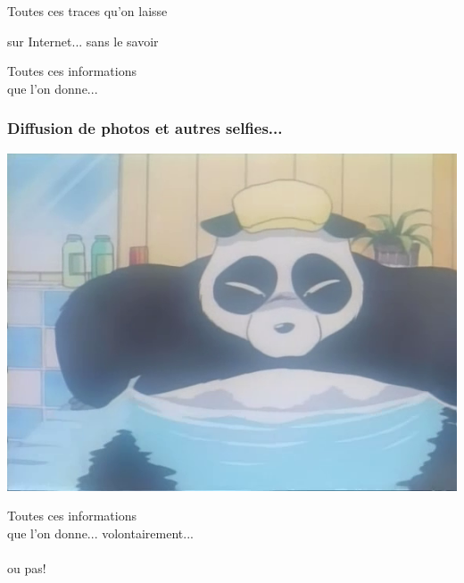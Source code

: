 \documentclass{beamer}
\begin{document}
\begin{frame}
\Huge{\centerline{Toutes ces traces qu'on laisse}}
\Huge{\centerline{sur Internet... sans le savoir}}
\end{frame}


\begin{frame}
\begin{center}
\Huge{Toutes ces informations \\ que l'on donne... }
\end{center}
\end{frame}

\begin{frame}
\frametitle{Diffusion de photos et autres selfies...}
\begin{center}
\includegraphics[scale=0.5] {./images/Leak02.png} 
\end{center}
\end{frame}

\begin{frame}
\begin{center}
\Huge{Toutes ces informations \\ que l'on donne... }
\Huge{volontairement...\\~\\ou pas!}
\end{center}
\end{frame}
\end{document}
